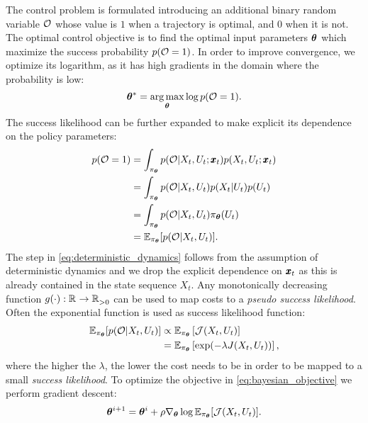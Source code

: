 The control problem is formulated introducing an additional binary random variable $\mathcal{O}$ whose value is $1$ when a trajectory is optimal, and $0$ when it is not. The optimal control objective is to find the optimal input parameters $\boldsymbol{\theta}$ which maximize the success probability $p(\mathcal{O} = 1)$. In order to improve convergence, we optimize its logarithm, as it has high gradients in the domain where the probability is low: 
\begin{equation} \label{eq:bayesian_objective}
    \boldsymbol{\theta}^* = \underset{\boldsymbol{\theta}}{\arg\max} \log p(\mathcal{O} = 1).
\end{equation}
The success likelihood can be further expanded to make explicit its dependence on the policy parameters:
\begin{align}
        p(\mathcal{O} = 1)
        &= \int_{\pi_{\boldsymbol{\theta}}} p(\mathcal{O} | X_t, U_t; \pmb{x}_t) p(X_t, U_t; \pmb{x}_t) \\
        &= \int_{\pi_{\boldsymbol{\theta}}}p(\mathcal{O} | X_t, U_t) p(X_t| U_t) p(U_t) \label{eq:deterministic_dynamics}\\
        &= \int_{\pi_{\boldsymbol{\theta}}}p(\mathcal{O} | X_t, U_t) \pi_{\boldsymbol{\theta}}(U_t) \\
        &= \mathbb{E}_{\pi_{\boldsymbol{\theta}}} [p(\mathcal{O} | X_t, U_t)].
        \label{eq:input_to_params}
\end{align}
The step in \eqref{eq:deterministic_dynamics} follows from the assumption of deterministic dynamics and we drop the explicit dependence on $\pmb{x}_t$ as this is already contained in the state sequence $X_t$. Any monotonically decreasing function $g(\cdot): \mathbb{R}^{} \rightarrow \mathbb{R}^{}_{>0}$ can be used to map costs to a \textit{pseudo success likelihood}. Often the exponential function is used as success likelihood function:
\begin{align}
    \mathbb{E}_{\pi_{\boldsymbol{\theta}}} [p(\mathcal{O} | X_t, U_t)]  
    &\propto \mathbb{E}_{\pi_{\boldsymbol{\theta}}} \left[ \mathcal{J}(X_t, U_t) \right] \\
    &= \mathbb{E}_{\pi_{\boldsymbol{\theta}}} \left[ \exp (-\lambda J(X_t, U_t)) \right],
\end{align}
where the higher the $\lambda$, the lower the cost needs to be in order to be mapped to a small \textit{success likelihood}. To optimize the objective in \eqref{eq:bayesian_objective} we perform gradient descent:
\begin{equation}
    \boldsymbol{\theta}^{i+1} 
    = \boldsymbol{\theta}^i + \rho \nabla_{ \boldsymbol{\theta}}\log \mathbb{E}_{\pi_{\boldsymbol{\theta}}} [\mathcal{J}(X_t, U_t)].
\end{equation}

